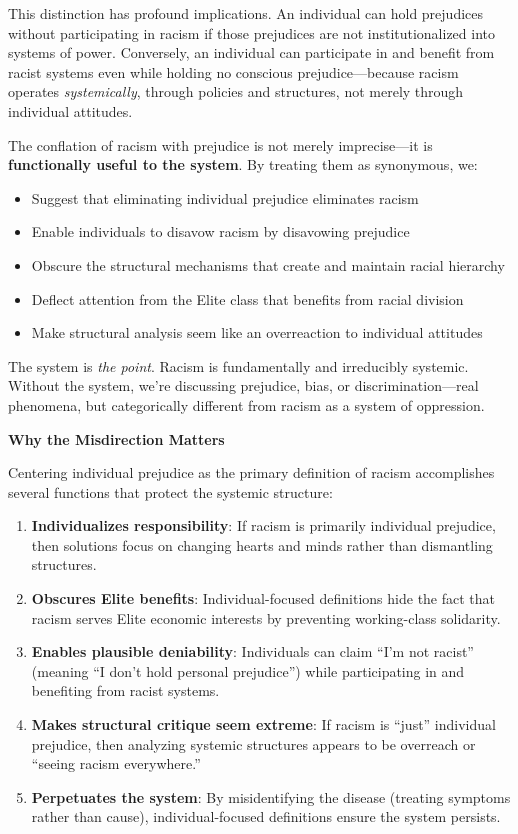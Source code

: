 \documentclass[12pt,openany]{book}
\begin{document}
This distinction has profound implications. An individual can hold prejudices without participating in racism if those prejudices are not institutionalized into systems of power. Conversely, an individual can participate in and benefit from racist systems even while holding no conscious prejudice---because racism operates \textit{systemically}, through policies and structures, not merely through individual attitudes.

The conflation of racism with prejudice is not merely imprecise---it is \textbf{functionally useful to the system}. By treating them as synonymous, we:
\begin{itemize}
    \item Suggest that eliminating individual prejudice eliminates racism
    \item Enable individuals to disavow racism by disavowing prejudice
    \item Obscure the structural mechanisms that create and maintain racial hierarchy
    \item Deflect attention from the Elite class that benefits from racial division
    \item Make structural analysis seem like an overreaction to individual attitudes
\end{itemize}

The system is \textit{the point}. Racism is fundamentally and irreducibly systemic. Without the system, we're discussing prejudice, bias, or discrimination---real phenomena, but categorically different from racism as a system of oppression.

\textbf{Why the Misdirection Matters}

Centering individual prejudice as the primary definition of racism accomplishes several functions that protect the systemic structure:

\begin{enumerate}
    \item \textbf{Individualizes responsibility}: If racism is primarily individual prejudice, then solutions focus on changing hearts and minds rather than dismantling structures.
    
    \item \textbf{Obscures Elite benefits}: Individual-focused definitions hide the fact that racism serves Elite economic interests by preventing working-class solidarity.
    
    \item \textbf{Enables plausible deniability}: Individuals can claim ``I'm not racist'' (meaning ``I don't hold personal prejudice'') while participating in and benefiting from racist systems.
    
    \item \textbf{Makes structural critique seem extreme}: If racism is ``just'' individual prejudice, then analyzing systemic structures appears to be overreach or ``seeing racism everywhere.''
    
    \item \textbf{Perpetuates the system}: By misidentifying the disease (treating symptoms rather than cause), individual-focused definitions ensure the system persists.
\end{enumerate}
\end{document}
